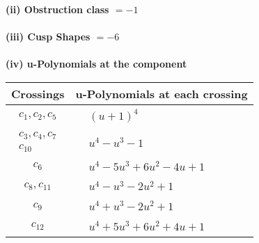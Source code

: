 \documentclass[1p]{elsarticle_modified}
\theoremstyle{definition}
\begin{document}
\flushleft \textbf{(ii) Obstruction class $= -1$}\\~\\
\flushleft \textbf{(iii) Cusp Shapes $= -6$}\\~\\
\newpage\renewcommand{\arraystretch}{1}
\flushleft \textbf{(iv) u-Polynomials at the component}\newline \\
\begin{tabular}{m{50pt}|m{274pt}}
Crossings & \hspace{64pt}u-Polynomials at each crossing \\
\hline $$\begin{aligned}c_{1},c_{2},c_{5}\end{aligned}$$&$\begin{aligned}
&(u+1)^4
\end{aligned}$\\
\hline $$\begin{aligned}c_{3},c_{4},c_{7}\\c_{10}\end{aligned}$$&$\begin{aligned}
&u^4- u^3-1
\end{aligned}$\\
\hline $$\begin{aligned}c_{6}\end{aligned}$$&$\begin{aligned}
&u^4-5 u^3+6 u^2-4 u+1
\end{aligned}$\\
\hline $$\begin{aligned}c_{8},c_{11}\end{aligned}$$&$\begin{aligned}
&u^4- u^3-2 u^2+1
\end{aligned}$\\
\hline $$\begin{aligned}c_{9}\end{aligned}$$&$\begin{aligned}
&u^4+u^3-2 u^2+1
\end{aligned}$\\
\hline $$\begin{aligned}c_{12}\end{aligned}$$&$\begin{aligned}
&u^4+5 u^3+6 u^2+4 u+1
\end{aligned}$\\
\hline
\end{tabular}\\~\\
\end{document}
